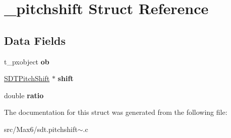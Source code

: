 \hypertarget{struct__pitchshift}{}\section{\+\_\+pitchshift Struct Reference}
\label{struct__pitchshift}
\subsection*{Data Fields}
\begin{DoxyCompactItemize}
\item 
\hypertarget{struct__pitchshift_a55b4380edb216f04a1c42b9095594963}{}t\+\_\+pxobject {\bfseries ob}\label{struct__pitchshift_a55b4380edb216f04a1c42b9095594963}

\item 
\hypertarget{struct__pitchshift_a8fd9928781ca79df089b800615249a42}{}\hyperlink{struct_s_d_t_pitch_shift}{S\+D\+T\+Pitch\+Shift} $\ast$ {\bfseries shift}\label{struct__pitchshift_a8fd9928781ca79df089b800615249a42}

\item 
\hypertarget{struct__pitchshift_aa422b0077d0c570937a73aa5b8eb4440}{}double {\bfseries ratio}\label{struct__pitchshift_aa422b0077d0c570937a73aa5b8eb4440}

\end{DoxyCompactItemize}


The documentation for this struct was generated from the following file\+:\begin{DoxyCompactItemize}
\item 
src/\+Max6/sdt.\+pitchshift$\sim$.\+c\end{DoxyCompactItemize}

